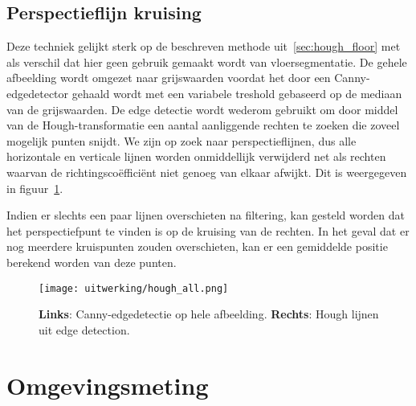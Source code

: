 \subsection{Perspectieflijn kruising}
Deze techniek gelijkt sterk op de beschreven methode uit~\ref{sec:hough_floor} met als verschil dat hier geen gebruik gemaakt wordt van vloersegmentatie.
De gehele afbeelding wordt omgezet naar grijswaarden voordat het door een Canny-edgedetector gehaald wordt met een variabele treshold gebaseerd op de mediaan van de grijswaarden.
De edge detectie wordt wederom gebruikt om door middel van de Hough-transformatie een aantal aanliggende rechten te zoeken die zoveel mogelijk punten snijdt.
We zijn op zoek naar perspectieflijnen, dus alle horizontale en verticale lijnen worden onmiddellijk verwijderd net als rechten waarvan de richtingsco\"{e}ffici\"{e}nt
niet genoeg van elkaar afwijkt. Dit is weergegeven in figuur~\ref{fig:hough_all}.

Indien er slechts een paar lijnen overschieten na filtering, kan gesteld worden dat het perspectiefpunt te vinden is op de kruising van de rechten.
In het geval dat er nog meerdere kruispunten zouden overschieten, kan er een gemiddelde positie berekend worden van deze punten.

\begin{figure}
    \texttt{[image: uitwerking/hough\_all.png]}
    \caption{\textbf{Links}: Canny-edgedetectie op hele afbeelding. \textbf{Rechts}: Hough lijnen uit edge detection.}
    \label{fig:hough_all}
\end{figure}


\section{Omgevingsmeting} \label{sec:omgevingsmeting}


